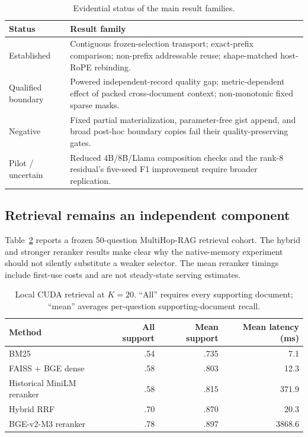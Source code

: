 \documentclass[11pt]{article}
\begin{document}
\begin{table}[ht]
\centering
\caption{Evidential status of the main result families.}
\label{tab:evidence-hierarchy}
\small
\begin{tabular}{p{.18\linewidth}p{.72\linewidth}}
\toprule
Status & Result family \\
\midrule
Established & Contiguous frozen-selection transport; exact-prefix comparison;
non-prefix addressable reuse; shape-matched host-RoPE rebinding. \\
Qualified boundary & Powered independent-record quality gap; metric-dependent
effect of packed cross-document context; non-monotonic fixed sparse masks. \\
Negative & Fixed partial materialization, parameter-free gist append, and broad
post-hoc boundary copies fail their quality-preserving gates. \\
Pilot / uncertain & Reduced 4B/8B/Llama composition checks and the rank-8
residual's five-seed F1 improvement require broader replication. \\
\bottomrule
\end{tabular}
\end{table}

\subsection{Retrieval remains an independent component}
Table~\ref{tab:retrieval-ladder} reports a frozen 50-question MultiHop-RAG
retrieval cohort. The hybrid and stronger reranker results make clear why the
native-memory experiment should not silently substitute a weaker selector.
The mean reranker timings include first-use costs and are not steady-state
serving estimates.

\begin{table}[ht]
\centering
\caption{Local CUDA retrieval at $K=20$. ``All'' requires every supporting
document; ``mean'' averages per-question supporting-document recall.}
\label{tab:retrieval-ladder}
\small
\begin{tabular}{lrrr}
\toprule
Method & All support & Mean support & Mean latency (ms) \\
\midrule
BM25 & .54 & .735 & 7.1 \\
FAISS + BGE dense & .58 & .803 & 12.3 \\
Historical MiniLM reranker & .58 & .815 & 371.9 \\
Hybrid RRF & .70 & .870 & 20.3 \\
BGE-v2-M3 reranker & .78 & .897 & 3868.6 \\
\bottomrule
\end{tabular}
\end{table}
\end{document}
